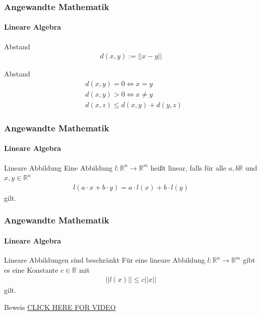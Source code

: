 \documentclass{beamer}
\begin{document}
\begin{frame}
    \frametitle{Angewandte Mathematik}
\framesubtitle{Lineare Algebra}
 \begin{block}{Abstand}
\begin{align*}
d(x,y) := ||x-y||
\end{align*}
\end{block}
 \begin{block}{Abstand}
\begin{align*}
& d(x,y)  = 0 \Leftrightarrow x = y \\
& d(x,y)  > 0 \Leftrightarrow x \neq y \\
& d(x,z)  \leq  d(x,y) + d(y,z) 
\end{align*}
\end{block}
 \end{frame}

\begin{frame}
    \frametitle{Angewandte Mathematik}
\framesubtitle{Lineare Algebra}
 \begin{block}{Lineare Abbildung}
Eine Abbildung $l :\mathbb{R}^n \to \mathbb{R}^m$ heißt linear, falls für alle $a,b \mathbb{R}$ und $x,y \in \mathbb{R}^n$
\begin{align*}
l(a\cdot x + b \cdot y) = a \cdot  l(x) + b \cdot  l(y) 
\end{align*}
gilt.
\end{block}
 \end{frame}


\begin{frame}
    \frametitle{Angewandte Mathematik}
\framesubtitle{Lineare Algebra}
 \begin{block}{Lineare Abbildungen sind beschränkt}
Für eine lineare Abbildung $l :\mathbb{R}^n \to \mathbb{R}^m$ gibt es eine Konstante $c \in \mathbb{R}$ mit
\begin{align*}
||l(x) || \leq c ||x||
\end{align*}
gilt.
\end{block}
 \begin{block}{Beweis}
\href{https://www.youtube.com/watch?v=r_aTO2PG91o}{CLICK HERE FOR VIDEO}
\end{block}


 \end{frame}
\end{document}
